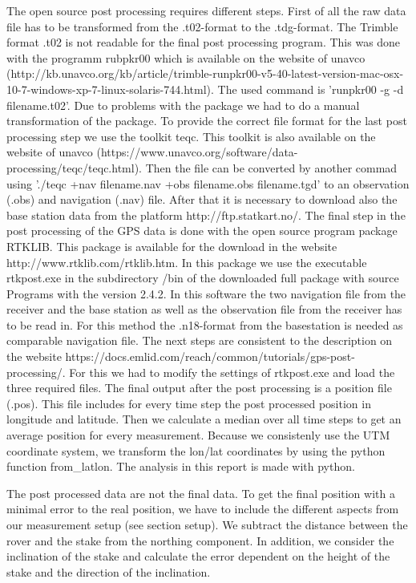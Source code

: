 The open source post processing requires different steps.
First of all the raw data file has to be transformed from the .t02-format to the .tdg-format. 
The Trimble format .t02 is not readable for the final post processing program.
This was done with the programm rubpkr00 which is available on the website of unavco (http://kb.unavco.org/kb/article/trimble-runpkr00-v5-40-latest-version-mac-osx-10-7-windows-xp-7-linux-solaris-744.html).
The used command is 'runpkr00 -g -d filename.t02'.
Due to problems with the package we had to do a manual transformation of the package.
To provide the correct file format for the last post processing step we use the toolkit teqc.
This toolkit is also available on the website of unavco (https://www.unavco.org/software/data-processing/teqc/teqc.html).
Then the file can be converted by another commad using './teqc +nav filename.nav +obs filename.obs filename.tgd' to an observation (.obs) and navigation (.nav) file.
After that it is necessary to download also the base station data from the platform http://ftp.statkart.no/.
The final step in the post processing of the GPS data is done with the open source program package RTKLIB.
This package is available for the download in the website http://www.rtklib.com/rtklib.htm.
In this package we use the executable rtkpost.exe in the subdirectory /bin of the downloaded full package with source Programs with the version 2.4.2.
In this software the two navigation file from the receiver and the base station as well as the observation file from the receiver has to be read in.
For this method the .n18-format from the basestation is needed as comparable navigation file.
The next steps are consistent to the description on the website https://docs.emlid.com/reach/common/tutorials/gps-post-processing/.
For this we had to modify the settings of rtkpost.exe and load the three required files. 
The final output after the post processing is a position file (.pos). 
This file includes for every time step the post processed position in longitude and latitude.
Then we calculate a median over all time steps to get an average position for every measurement.
Because we consistenly use the UTM coordinate system, we transform the lon/lat coordinates by using the python function from\_latlon.
The analysis in this report is made with python.\medskip

The post processed data are not the final data. 
To get the final position with a minimal error to the real position, we have to include the different aspects from our measurement setup (see section setup).
We subtract the distance between the rover and the stake from the northing component.
In addition, we consider the inclination of the stake and calculate the error dependent on the height of the stake and the direction of the inclination.\medskip


